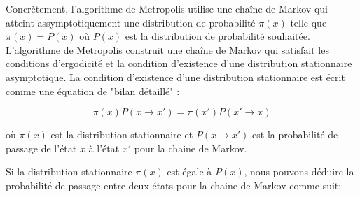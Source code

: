 \documentclass[11pt]{article}
\theoremstyle{definition}
\theoremstyle{remark}
\begin{document}
Concrètement, l'algorithme de Metropolis utilise une chaîne de Markov qui atteint assymptotiquement une distribution de probabilité $\pi(x)$ telle que $\pi(x) = P(x)$ où $P(x)$ est la distribution de probabilité souhaitée. L'algorithme de Metropolis construit une chaîne de Markov qui satisfait les conditions d'ergodicité et la condition d'existence d'une distribution stationnaire asymptotique. La condition d'existence d'une distribution stationnaire est écrit comme une équation de "bilan détaillé" :

\begin{equation}
\label{detailed_balance}
\pi(x) P(x \rightarrow x') = \pi(x') P(x' \rightarrow x)
\end{equation} 

où $\pi(x)$ est la distribution stationnaire et $P(x \rightarrow x')$ est la probabilité de passage de l'état $x$ à l'état $x'$ pour la chaine de Markov.  

Si la distribution stationnaire $\pi(x)$ est égale à $P(x)$, nous pouvons déduire la probabilité de passage entre deux états pour la chaine de Markov comme suit: 
\end{document}
